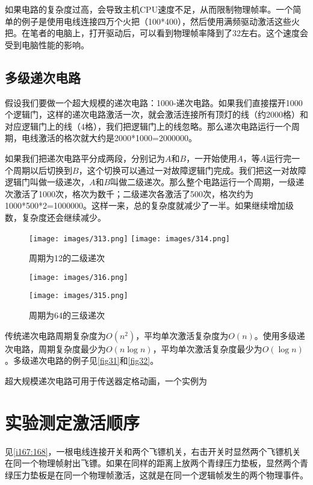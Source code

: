 如果电路的复杂度过高，会导致主机CPU速度不足，从而限制物理帧率。一个简单的例子是使用电线连接四万个火把（100*400），然后使用满频驱动激活这些火把。在笔者的电脑上，打开驱动后，可以看到物理帧率降到了32左右。这个速度会受到电脑性能的影响。

\subsection{多级递次电路}\label{sec5}
假设我们要做一个超大规模的递次电路：1000-递次电路。如果我们直接摆开1000个逻辑门，这样的递次电路激活一次，就会激活连接所有顶灯的线（约2000格）和对应逻辑门上的线（4格），我们把逻辑门上的线忽略。那么递次电路运行一个周期，电线激活的格次就大约是2000*1000=2000000。

如果我们把递次电路平分成两段，分别记为$A$和$B$，一开始使用$A$，等$A$运行完一个周期以后切换到$B$，这个切换可以通过一对故障逻辑门完成。我们把这一对故障逻辑门叫做一级递次，$A$和$B$叫做二级递次。那么整个电路运行一个周期，一级递次激活了1000次，格次为数千；二级递次各激活了500次，格次约为1000*500*2=1000000。这样一来，总的复杂度就减少了一半。如果继续增加级数，复杂度还会继续减少。

\begin{figure}[!ht]
    \centering
    \texttt{[image: images/313.png]}
    \qquad
    \texttt{[image: images/314.png]}
    \caption{周期为12的二级递次}\label{fig31}
\end{figure}
\begin{figure}[!ht]
    \centering
    \texttt{[image: images/316.png]}

    \texttt{[image: images/315.png]}
    \caption{周期为64的三级递次}\label{fig32}
\end{figure}

传统递次电路周期复杂度为$O(n^2)$，平均单次激活复杂度为$O(n)$。使用多级递次电路，周期复杂度最少为$O(n\log n)$，平均单次激活复杂度最少为$O(\log n)$。多级递次电路的例子见\autoref{fig31}和\autoref{fig32}。

超大规模递次电路可用于传送器定格动画，一个实例为

\section{实验测定激活顺序}

见\autoref{i167:168}，一根电线连接开关和两个飞镖机关，右击开关时显然两个飞镖机关在同一个物理帧射出飞镖。如果在同样的距离上放两个青绿压力垫板，显然两个青绿压力垫板是在同一个物理帧激活，这就是在同一个逻辑帧发生的两个物理事件。

